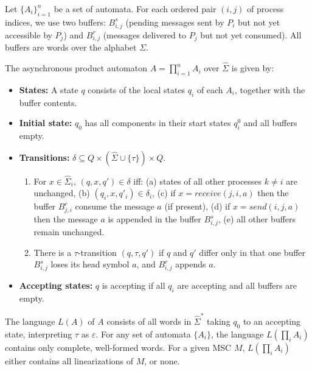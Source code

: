 \begin{definition}
Let $\{A_i\}_{i=1}^n$ be a set of automata. For each ordered pair 
$(i,j)$ of process indices, we use two buffers: $B^s_{i,j}$ 
(pending messages sent by $P_i$ but not yet accessible by $P_j$) 
and $B^r_{i,j}$ (messages delivered to $P_j$ but not yet consumed). 
All buffers are words over the alphabet $\Sigma$.

The asynchronous product automaton 
$A = \prod_{i=1}^n A_i$ over $\hat{\Sigma}$ is given by: %

\begin{itemize}
  \item \textbf{States:} A state $q$ consists of the local states 
  $q_i$ of each $A_i$, together with the buffer contents.
  \item \textbf{Initial state:} $q_0$ has all components in their 
  start states $q_i^0$ and all buffers empty.
  \item \textbf{Transitions:} $\delta \subseteq Q \times 
  (\hat{\Sigma} \cup \{\tau\}) \times Q$.
    \begin{enumerate}
      \item For $x \in \hat{\Sigma}_i$, $(q,x,q') \in \delta$ iff:  
      (a) states of all other processes $k \neq i$ are unchanged,  
      (b) $(q_i,x,q'_i) \in \delta_i$,  
      (c) if $x = receive(j,i,a)$ then the buffer $B^r_{j,i}$ consume the message $a$ (if present),  
      (d) if $x = send(i,j,a)$ then the message $a$ is appended in the buffer $B^s_{i,j}$,  
      (e) all other buffers remain unchanged.
      \item There is a $\tau$-transition $(q,\tau,q')$ if $q$ and 
      $q'$ differ only in that one buffer $B^s_{i,j}$ loses its 
      head symbol $a$, and $B^r_{i,j}$ appends $a$.
    \end{enumerate}
  \item \textbf{Accepting states:} $q$ is accepting if all $q_i$ 
  are accepting and all buffers are empty.
\end{itemize}

The language $L(A)$ of $A$ consists of all words in $\hat{\Sigma}^*$ 
taking $q_0$ to an accepting state, interpreting $\tau$ as 
$\varepsilon$. For any set of automata $\{A_i\}$, the language 
$L(\prod_i A_i)$ contains only complete, well-formed words. For a 
given MSC $M$, $L(\prod_i A_i)$ either contains all linearizations 
of $M$, or none.
\end{definition}

